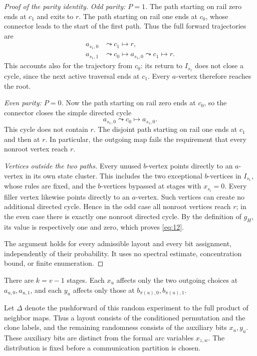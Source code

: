 \documentclass[11pt]{article}
\theoremstyle{definition}
\theoremstyle{remark}
\numberwithin{equation}{section}
\begin{document}
\begin{proof}[Proof of the parity identity]
\emph{Odd parity: \(P=1\).}
The path starting on rail zero ends at \(c_1\) and exits to
\(r\). The path starting on rail one ends at \(c_0\), whose
connector leads to the start of the first path. Thus the full
forward trajectories are
\[
\begin{aligned}
 a_{s_1,0}&\leadsto c_1\longmapsto r,\\
 a_{s_1,1}&\leadsto c_0\longmapsto
 a_{s_1,0}\leadsto c_1\longmapsto r.
\end{aligned}
\]
This accounts also for the trajectory from \(c_0\): its return
to \(I_{s_1}\) does not close a cycle, since the next active
traversal ends at \(c_1\). Every \(a\)-vertex therefore reaches
the root.

\emph{Even parity: \(P=0\).}
Now the path starting on rail zero ends at \(c_0\), so the
connector closes the simple directed cycle
\[
 a_{s_1,0}\leadsto c_0\longmapsto a_{s_1,0}.
\]
This cycle does not contain \(r\). The disjoint path starting
on rail one ends at \(c_1\) and then at \(r\).
In particular, the outgoing map fails the requirement that
every nonroot vertex reach \(r\).

\emph{Vertices outside the two paths.}
Every unused \(b\)-vertex points directly to an \(a\)-vertex
in its own state cluster. This includes the two exceptional
\(b\)-vertices in \(I_{s_1}\), whose rules are fixed, and
the \(b\)-vertices bypassed at stages with \(x_{s_i}=0\).
Every filler vertex likewise points directly to an \(a\)-vertex.
Such vertices can create no additional directed cycle.
Hence in the odd case all nonroot vertices reach \(r\);
in the even case there is exactly one nonroot directed cycle.
By the definition of \(g_H\), its value is respectively
one and zero, which proves \eqref{eq:12}.

The argument holds for every admissible layout and every bit
assignment, independently of their probability. It uses no
spectral estimate, concentration bound, or finite enumeration.
\end{proof}

There are \(k=v-1\) stages. Each \(x_u\) affects only the two
outgoing choices at \(a_{u,0},a_{u,1}\), and each \(y_u\) affects
only those at \(b_{\pi(u),0},b_{\pi(u),1}\).

Let \(\Delta\) denote the pushforward of this random experiment to
the full product of neighbor maps. Thus a layout consists of the
conditioned permutation and the clone labels, and the remaining
randomness consists of the auxiliary bits \(x_u,y_u\). These auxiliary
bits are distinct from the formal arc variables \(x_{z,w}\).
The distribution is fixed before a communication partition is chosen.
\end{document}
